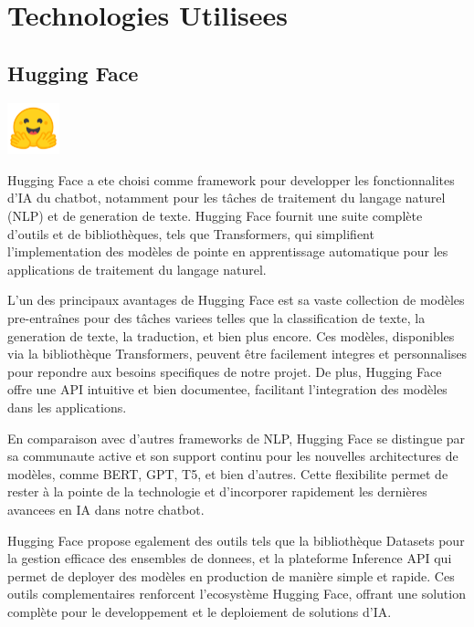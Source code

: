 \documentclass[a4paper, 11pt, openany]{report}
\begin{document}
\newpage

\section{Technologies Utilisees}

\subsection{Hugging Face}
\begin{center}
\includegraphics[height=1.5cm]{assets/images/face.png}
\end{center}

Hugging Face a ete choisi comme framework pour developper les fonctionnalites d'IA du chatbot, notamment pour les tâches de traitement du langage naturel (NLP) et de generation de texte. Hugging Face fournit une suite complète d'outils et de bibliothèques, tels que Transformers, qui simplifient l'implementation des modèles de pointe en apprentissage automatique pour les applications de traitement du langage naturel.

L'un des principaux avantages de Hugging Face est sa vaste collection de modèles pre-entraînes pour des tâches variees telles que la classification de texte, la generation de texte, la traduction, et bien plus encore. Ces modèles, disponibles via la bibliothèque Transformers, peuvent être facilement integres et personnalises pour repondre aux besoins specifiques de notre projet. De plus, Hugging Face offre une API intuitive et bien documentee, facilitant l'integration des modèles dans les applications.

En comparaison avec d'autres frameworks de NLP, Hugging Face se distingue par sa communaute active et son support continu pour les nouvelles architectures de modèles, comme BERT, GPT, T5, et bien d'autres. Cette flexibilite permet de rester à la pointe de la technologie et d'incorporer rapidement les dernières avancees en IA dans notre chatbot.

Hugging Face propose egalement des outils tels que la bibliothèque Datasets pour la gestion efficace des ensembles de donnees, et la plateforme Inference API qui permet de deployer des modèles en production de manière simple et rapide. Ces outils complementaires renforcent l'ecosystème Hugging Face, offrant une solution complète pour le developpement et le deploiement de solutions d'IA.
\end{document}
